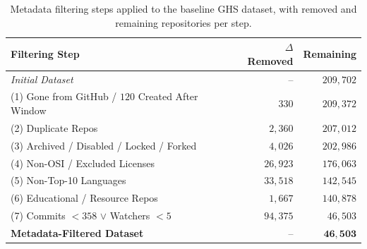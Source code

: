 \begin{table}[H]
\centering
\begin{tabular}{lrr}
\toprule
\textbf{Filtering Step} & $\Delta$ \textbf{Removed} & \textbf{Remaining} \\
\midrule
\textit{Initial Dataset} & -- & $209{,}702$ \\
\midrule
(1) Gone from GitHub / $120$ Created After Window & $330$ & $209{,}372$ \\
\midrule
(2) Duplicate Repos & $2{,}360$ & $207{,}012$ \\
\midrule
(3) Archived / Disabled / Locked / Forked & $4{,}026$ & $202{,}986$ \\
\midrule
(4) Non-OSI / Excluded Licenses & $26{,}923$ & $176{,}063$ \\
\midrule
(5) Non-Top-10 Languages & $33{,}518$ & $142{,}545$ \\
\midrule
(6) Educational / Resource Repos & $1{,}667$ & $140{,}878$ \\
\midrule
(7) Commits $<358$ $\lor$ Watchers $<5$ & $94{,}375$ & $46{,}503$ \\
\midrule
\midrule
\textbf{Metadata-Filtered Dataset} & -- & $\mathbf{46{,}503}$ \\
\bottomrule
\end{tabular}
\caption{Metadata filtering steps applied to the baseline GHS dataset, with removed and remaining repositories per step.}
\label{tab:filtering-table}
\end{table}
